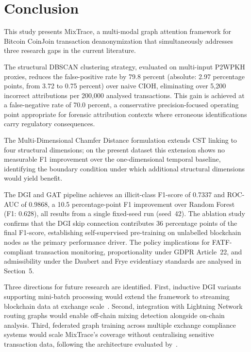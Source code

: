 \documentclass[12pt,a4paper]{article}
\begin{document}
\section{Conclusion}
\label{sec:conclude}

This study presents MixTrace, a multi-modal graph attention
framework for Bitcoin CoinJoin transaction deanonymization
that simultaneously addresses three research gaps in the
current literature.

The structural DBSCAN clustering strategy, evaluated on
multi-input P2WPKH proxies, reduces the false-positive rate
by 79.8 percent (absolute: 2.97 percentage points, from
3.72 to 0.75 percent) over naive CIOH, eliminating over
5,200 incorrect attributions per 200,000 analysed
transactions. This gain is achieved at a false-negative rate
of 70.0 percent, a conservative precision-focused operating
point appropriate for forensic attribution contexts where
erroneous identifications carry regulatory consequences.

The Multi-Dimensional Chamfer Distance formulation extends
CST linking to four structural dimensions; on the present
dataset this extension shows no measurable F1 improvement
over the one-dimensional temporal baseline, identifying the
boundary condition under which additional structural
dimensions would yield benefit.

The DGI and GAT pipeline achieves an illicit-class F1-score
of 0.7337 and ROC-AUC of 0.9868, a 10.5 percentage-point
F1 improvement over Random Forest (F1: 0.628), all results
from a single fixed-seed run (seed~42). The ablation study
confirms that the DGI skip connection contributes 36
percentage points of the final F1-score, establishing
self-supervised pre-training on unlabelled blockchain nodes
as the primary performance driver. The policy implications
for FATF-compliant transaction monitoring, proportionality
under GDPR Article~22, and admissibility under the Daubert
and Frye evidentiary standards are analysed in Section~5.

Three directions for future research are identified. First,
inductive DGI variants supporting mini-batch processing
would extend the framework to streaming blockchain data at
exchange scale~\citep{chithanuru2025}. Second, integration
with Lightning Network routing graphs would enable off-chain
mixing detection alongside on-chain analysis. Third,
federated graph training across multiple exchange compliance
systems would scale MixTrace's coverage without centralising
sensitive transaction data, following the architecture
evaluated by~\citet{ahmed2024fed}.
\end{document}
